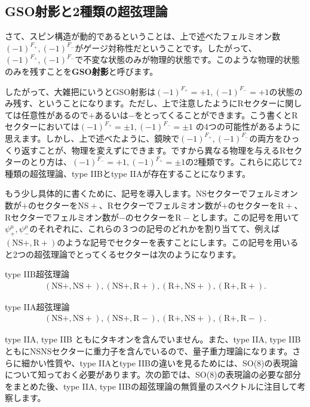 \documentclass[report,paper=a4, fontsize=12pt, line_length=16cm, number_of_lines=34,dvipdfmx]{jlreq}
\newenvironment{important}{\begin{tcolorbox}[
  colback = white,
  colframe = red!35,
  boxrule = 2mm,
  fonttitle = \bfseries,
  after = \noindent] }{\end{tcolorbox}}
\numberwithin{equation}{chapter}
\numberwithin{equation}{section}
\newcommand{\kyou}[1]{{\sffamily \bfseries #1}}
\newcommand{\NSp}{\mathrm{NS}+}
\newcommand{\Rp}{\mathrm{R}+}
\newcommand{\Rm}{\mathrm{R}-}
\begin{document}
\subsection{GSO射影と2種類の超弦理論}
さて、スピン構造が動的であるということは、上で述べたフェルミオン数$(-1)^{F_{+}},(-1)^{F_{-}}$がゲージ対称性だということです。したがって、$(-1)^{F_{+}},(-1)^{F_{-}}$で不変な状態のみが物理的状態です。このような物理的状態のみを残すことを\kyou{GSO射影}と呼びます。

したがって、大雑把にいうとGSO射影は$(-1)^{F_{+}}=+1,(-1)^{F_{-}}=+1$の状態のみ残す、ということになります。ただし、上で注意したようにRセクターに関しては任意性があるので$+$あるいは$-$をとってくることができます。こう書くとRセクターにおいては$(-1)^{F_{+}}=\pm 1,(-1)^{F_{-}}=\pm 1$ の4つの可能性があるように思えます。しかし、上で述べたように、鏡映で$(-1)^{F_{+}},(-1)^{F_{-}}$の両方をひっくり返すことが、物理を変えずにできます。ですから異なる物理を与えるRセクターのとり方は、$(-1)^{F_{-}}=+1,(-1)^{F_{+}}=\pm 1$の2種類です。これらに応じて2種類の超弦理論、type IIBとtype IIAが存在することになります。

もう少し具体的に書くために、記号を導入します。NSセクターでフェルミオン数が$+$のセクターを$\NSp$、Rセクターでフェルミオン数が$+$のセクターを$\Rp$、Rセクターでフェルミオン数が$-$のセクターを$\Rm$とします。この記号を用いて$\psi^{\mu}_{+},\psi^{\mu}_{-}$のそれぞれに、これらの３つの記号のどれかを割り当てて、例えば$(\NSp,\Rp)$のような記号でセクターを表すことにします。この記号を用いると2つの超弦理論でとってくるセクターは次のようになります。
\begin{important}
  type IIB超弦理論
  \begin{align}
    (\NSp,\NSp),
    (\NSp,\Rp),
    (\Rp,\NSp),
    (\Rp,\Rp).
  \end{align}
\end{important}
\begin{important}
  type IIA超弦理論
  \begin{align}
    (\NSp,\NSp),
    (\NSp,\Rm),
    (\Rp,\NSp),
    (\Rp,\Rm).
  \end{align}
\end{important}

type IIA, type IIB ともにタキオンを含んでいません。また、type IIA, type IIB ともにNSNSセクターに重力子を含んでいるので、量子重力理論になります。さらに細かい性質や、type IIAとtype IIBの違いを見るためには、SO(8)の表現論について知っておく必要があります。次の節では、SO(8)の表現論の必要な部分をまとめた後、type IIA, type IIBの超弦理論の無質量のスペクトルに注目して考察します。
\end{document}
